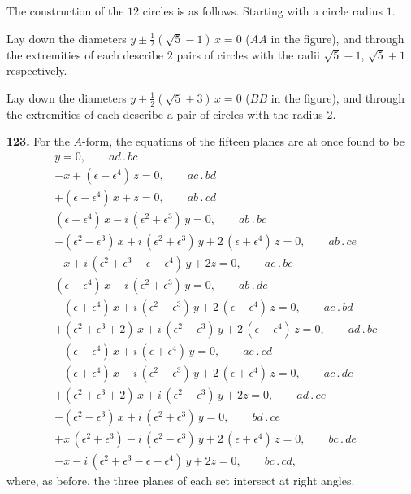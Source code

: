 \documentclass[11pt]{article}
\newcommand{\artno}[1]{\textbf{#1.}\quad}
\begin{document}
The construction of the $12$ circles is as follows. Starting with a circle
radius $1$.

Lay down the diameters $y \pm \tfrac{1}{2}(\sqrt{5} - 1)\,x = 0$
($AA$ in the figure), and through the extremities of each describe $2$ pairs
of circles with the radii $\sqrt{5} - 1$, $\sqrt{5} + 1$ respectively.

Lay down the diameters $y \pm \tfrac{1}{2}(\sqrt{5} + 3)\,x = 0$
($BB$ in the figure), and through the extremities of each describe a pair of
circles with the radius $2$.

\medskip
\noindent
\artno{123} For the $A$-form, the equations of the fifteen planes are at
once found to be
\begin{align*}
  &y = 0,\qquad ad\,.\,bc\\
  &-x + (\epsilon - \epsilon^{4})\,z = 0,\qquad ac\,.\,bd\\
  &+ (\epsilon - \epsilon^{4})\,x + z = 0,\qquad ab\,.\,cd\\
  &(\epsilon - \epsilon^{4})\,x - i\,(\epsilon^{2} + \epsilon^{3})\,y = 0,\qquad ab\,.\,bc\\
  &-(\epsilon^{2} - \epsilon^{3})\,x + i\,(\epsilon^{2} + \epsilon^{3})\,y
     + 2\,(\epsilon + \epsilon^{4})\,z = 0,\qquad ab\,.\,ce\\
  &-x + i\,(\epsilon^{2} + \epsilon^{3} - \epsilon - \epsilon^{4})\,y + 2z = 0,\qquad ae\,.\,bc\\
  &(\epsilon - \epsilon^{4})\,x - i\,(\epsilon^{2} + \epsilon^{3})\,y = 0,\qquad ab\,.\,de\\
  &-(\epsilon + \epsilon^{4})\,x + i\,(\epsilon^{2} - \epsilon^{3})\,y
     + 2\,(\epsilon - \epsilon^{4})\,z = 0,\qquad ae\,.\,bd\\
  &+ (\epsilon^{2} + \epsilon^{3} + 2)\,x + i\,(\epsilon^{2} - \epsilon^{3})\,y
     + 2\,(\epsilon - \epsilon^{4})\,z = 0,\qquad ad\,.\,bc\\
  &-(\epsilon - \epsilon^{4})\,x + i\,(\epsilon + \epsilon^{4})\,y = 0,\qquad ae\,.\,cd\\
  &-(\epsilon + \epsilon^{4})\,x - i\,(\epsilon^{2} - \epsilon^{3})\,y
     + 2\,(\epsilon + \epsilon^{4})\,z = 0,\qquad ac\,.\,de\\
  &+ (\epsilon^{2} + \epsilon^{3} + 2)\,x + i\,(\epsilon^{2} - \epsilon^{3})\,y
     + 2z = 0,\qquad ad\,.\,ce\\
  &-(\epsilon^{2} - \epsilon^{3})\,x + i\,(\epsilon^{2} + \epsilon^{3})\,y = 0,\qquad bd\,.\,ce\\
  &+ x\,(\epsilon^{2} + \epsilon^{3}) - i\,(\epsilon^{2} - \epsilon^{3})\,y
     + 2\,(\epsilon + \epsilon^{4})\,z = 0,\qquad bc\,.\,de\\
  &-x - i\,(\epsilon^{2} + \epsilon^{3} - \epsilon - \epsilon^{4})\,y + 2z = 0,\qquad bc\,.\,cd,
\end{align*}
where, as before, the three planes of each set intersect at right angles.
\end{document}
